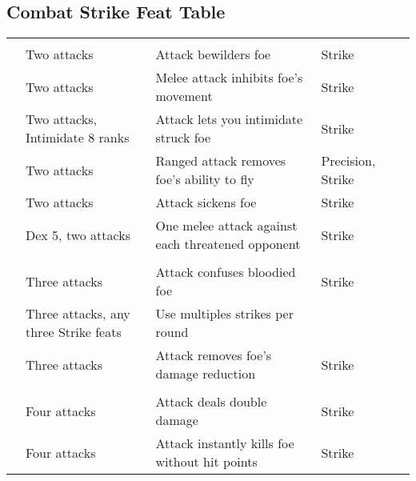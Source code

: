 \subsection{Combat Strike Feat Table}

{\small
    \begin{longtabu}{>{\lcol}p{10em} >{\lcol}p{15em} >{\lcol}X >{\lcol}p{6em} >{\lcol}p{3em}}
         &  &  &  &  \\
         & Two attacks & Attack bewilders foe & Strike &  \\
         & Two attacks & Melee attack inhibits foe's movement & Strike &  \\
         & Two attacks, Intimidate 8 ranks & Attack lets you intimidate struck foe & Strike &  \\
         & Two attacks & Ranged attack removes foe's ability to fly & Precision, Strike &  \\
         & Two attacks & Attack sickens foe & Strike &  \\
         & Dex 5, two attacks & One melee attack against each threatened opponent & Strike &  \\

        \midrule
         &  &  &  &  \\
         & Three attacks & Attack confuses bloodied foe & Strike &  \\
         & Three attacks, any three Strike feats & Use multiples strikes per round & \x &  \\
         & Three attacks & Attack removes foe's damage reduction & Strike &  \\

        \midrule
         &  &  &  &  \\
         & Four attacks & Attack deals double damage & Strike &  \\
         & Four attacks & Attack instantly kills foe without hit points & Strike &  \\
    \end{longtabu}
}%

